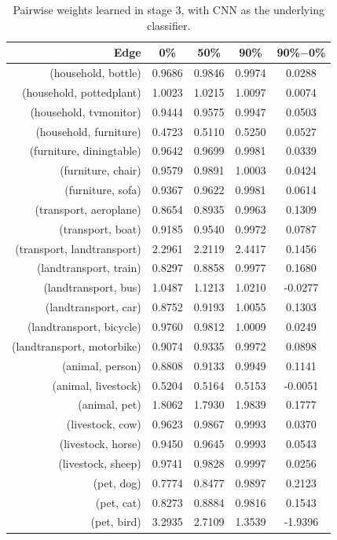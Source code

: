 \documentclass[11pt,a4paper]{article}
\begin{document}
\begin{table}[htbp]
\centering
\begin{tabular}{r|c|c|c|c}
Edge & 0\% & 50\% & 90\% & 90\%$-$0\%\\\hline
(household, bottle)        & 0.9686 & 0.9846 & 0.9974 & 0.0288\\
(household, pottedplant)   & 1.0023 & 1.0215 & 1.0097 & 0.0074\\
(household, tvmonitor)     & 0.9444 & 0.9575 & 0.9947 & 0.0503\\
(household, furniture)     & 0.4723 & 0.5110 & 0.5250 & 0.0527\\
(furniture, diningtable)   & 0.9642 & 0.9699 & 0.9981 & 0.0339\\
(furniture, chair)         & 0.9579 & 0.9891 & 1.0003 & 0.0424\\
(furniture, sofa)          & 0.9367 & 0.9622 & 0.9981 & 0.0614\\
(transport, aeroplane)     & 0.8654 & 0.8935 & 0.9963 & 0.1309\\
(transport, boat)          & 0.9185 & 0.9540 & 0.9972 & 0.0787\\
(transport, landtransport) & 2.2961 & 2.2119 & 2.4417 & 0.1456\\
(landtransport, train)     & 0.8297 & 0.8858 & 0.9977 & 0.1680\\
(landtransport, bus)       & 1.0487 & 1.1213 & 1.0210 & -0.0277\\
(landtransport, car)       & 0.8752 & 0.9193 & 1.0055 & 0.1303\\
(landtransport, bicycle)   & 0.9760 & 0.9812 & 1.0009 & 0.0249\\
(landtransport, motorbike) & 0.9074 & 0.9335 & 0.9972 & 0.0898\\
(animal, person)           & 0.8808 & 0.9133 & 0.9949 & 0.1141\\
(animal, livestock)        & 0.5204 & 0.5164 & 0.5153 & -0.0051\\
(animal, pet)              & 1.8062 & 1.7930 & 1.9839 & 0.1777\\
(livestock, cow)           & 0.9623 & 0.9867 & 0.9993 & 0.0370\\
(livestock, horse)         & 0.9450 & 0.9645 & 0.9993 & 0.0543\\
(livestock, sheep)         & 0.9741 & 0.9828 & 0.9997 & 0.0256\\
(pet, dog)                 & 0.7774 & 0.8477 & 0.9897 & 0.2123\\
(pet, cat)                 & 0.8273 & 0.8884 & 0.9816 & 0.1543\\
(pet, bird)                & 3.2935 & 2.7109 & 1.3539 & -1.9396
\end{tabular}
\caption{Pairwise weights learned in stage 3, with CNN as the underlying classifier.}
\label{tab:cnnpairwise}
\end{table}
\end{document}
